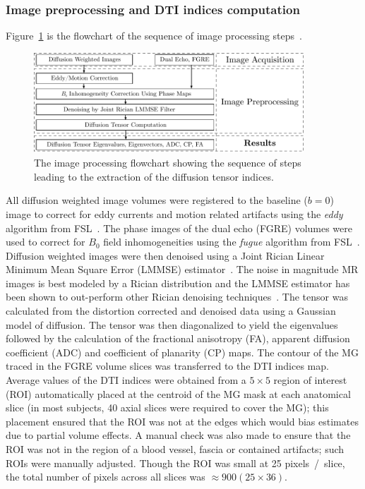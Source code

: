 \subsubsection{Image preprocessing and DTI indices computation}
Figure~\ref{fig: DTI-flowchart} is the flowchart of the sequence of image processing steps~\cite{DTI}.
\begin{figure}[!h]
\vspace{+0.2cm}
\centering
\includegraphics[width=0.9\textwidth]{Figures/DTI_flowchart.pdf}
\caption[The image processing flowchart showing the sequence of steps leading to the extraction of the diffusion tensor indices]{The image processing flowchart showing the sequence of steps leading to the extraction of the diffusion tensor indices.}
\label{fig: DTI-flowchart}
\end{figure}
All diffusion weighted image volumes were registered to the baseline ($b=0$) image to correct for eddy currents and motion related artifacts using the \textit{eddy} algorithm from FSL~\cite{RND23}. 
The phase images of the dual echo (FGRE) volumes were used to correct for $B_0$ field inhomogeneities using the \textit{fugue} algorithm from FSL~\cite{RND23}.
Diffusion weighted images were then denoised using a Joint Rician Linear Minimum Mean Square Error (LMMSE) estimator~\cite{RND24}. 
The noise in magnitude MR images is best modeled by a Rician distribution and the LMMSE estimator has been shown to out-perform other Rician denoising techniques~\cite{RND25}.
The tensor was calculated from the distortion corrected and denoised data using a Gaussian model of diffusion.
The tensor was then diagonalized to yield the eigenvalues followed by the calculation of the fractional anisotropy (FA), apparent diffusion coefficient (ADC) and coefficient of planarity (CP) maps. 
The contour of the MG traced in the FGRE volume slices was transferred to the DTI indices map.
Average values of the DTI indices were obtained from a $5 \times 5$ region of interest (ROI) automatically placed at the centroid of the MG mask at each anatomical slice (in most subjects, 40 axial slices were required to cover the MG); this placement ensured that the ROI was not at the edges which would bias estimates due to partial volume effects. 
A manual check was also made to ensure that the ROI was not in the region of a blood vessel, fascia or contained artifacts; such ROIs were manually adjusted. 
Though the ROI was small at 25 pixels~/~slice, the total number of pixels across all slices was $\approx 900 (25 \times 36)$. 
